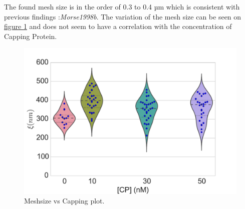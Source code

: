 \documentclass[A4paperpaper,11pt,english]{sphinxmanual}
\begin{document}
The found mesh size is in the order of 0.3 to 0.4 µm which is consistent with previous findings
:\emph{Morse1998b}. The variation of the
mesh size can be seen on \hyperref[index-latex:xi-violin]{figure  \ref*{index-latex:xi-violin}} and does not seem to have a
correlation with the concentration of Capping Protein.
\begin{figure}[htbp]
\centering
\capstart

\includegraphics[width=0.800\linewidth]{xi_violin.pdf}
\caption{Meshsize vs Capping plot.}\label{index-latex:xi-violin}\end{figure}
\end{document}
